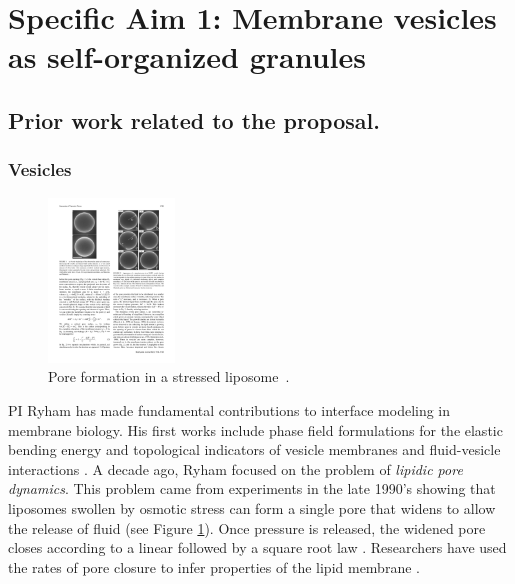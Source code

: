 \section{Specific Aim 1: Membrane vesicles as self-organized granules}
\label{sec:specific_aim1}
\subsection{Prior work related to the proposal.}

\subsubsection{Vesicles}
\begin{figure}
  \vspace{-5pt}
\centerline{\includegraphics[width=0.3\textwidth]{figures/SA1Figures/LiposomePore.pdf}}
  \vspace{-5pt}
\caption{\label{fig:LiposomePore}Pore formation in a
stressed liposome~\cite{Kaetal03, BrdGSa00}.}
\end{figure}
PI Ryham has made fundamental contributions to interface modeling in
membrane biology.  His first works include
phase field formulations for the elastic bending energy \cite{0951-7715-18-3-016,Du05}
and 
topological indicators \cite{DuEuler} of vesicle membranes
and fluid-vesicle interactions \cite{QiangDu09}.
A decade ago, Ryham focused on the
problem of \emph{lipidic pore dynamics}.  
This problem came from 
experiments in the late 1990's 
showing that liposomes swollen by osmotic stress can form a single pore that
widens to allow the release of fluid (see Figure \ref{fig:LiposomePore}). 
Once pressure is released,
the widened pore closes according to a linear
followed by a square root law \cite{BrdGSa00}.  Researchers have
used the rates of pore closure to infer properties of the lipid membrane \cite{PoDi10}. 


